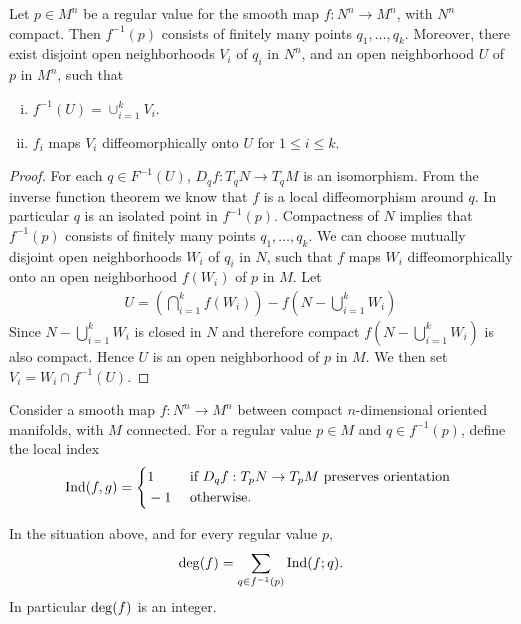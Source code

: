 \begin{lemma}\label{lemma:11-8}
  Let $p\in M^n$ be a regular value for the smooth map $f:N^n\to M^n$, with $N^n$ compact. 
  Then $f^{-1}(p)$ consists of finitely many points $q_1, \ldots, q_k$. Moreover, there exist 
  disjoint open neighborhoods $V_i$ of $q_i$ in $N^n$, and an open neighborhood $U$ of $p$ in $M^n$,
  such that
  \begin{enumerate}[(i)]
    \item $f^{-1}(U) = \cup_{i=1}^k V_i$.
    \item $f_i$ maps $V_i$ diffeomorphically onto $U$ for $1\le i\le k$.
  \end{enumerate}
\end{lemma}

\begin{proof}
  For each $q\in F^{-1}(U)$, $D_qf:T_qN\to T_q M$ is an isomorphism. From the
inverse function theorem we know that $f$ is a local diffeomorphism around $q$. In
particular $q$ is an isolated point in $f^{-1}(p)$. Compactness of $N$ implies that $f^{-1}(p)$
consists of finitely many points $q_1, \ldots, q_k$. We can choose mutually disjoint open
neighborhoods $W_i$ of $q_i$ in $N$, such that $f$ maps $W_i$ diffeomorphically onto an
open neighborhood $f(W_i)$ of $p$ in $M$. Let
\begin{align*}
  U = \left(\bigcap_{i=1}^k f(W_i)\right)
    - f\left(N - \bigcup_{i=1}^k W_i\right) 
\end{align*}
Since $N - \bigcup_{i=1}^k W_i$ is closed in $N$ and therefore compact $f(N - \bigcup_{i=1}^k W_i)$ is 
also compact. Hence $U$ is an open neighborhood of $p$ in $M$. We then set 
$V_i = W_i\cap f^{-1}(U)$.
\end{proof}

Consider a smooth map $f:N^n\to M^n$ between compact $n$-dimensional oriented
manifolds, with $M$ connected. For a regular value $p\in M$ and $q\in f^{-1}(p)$, define
the local index
\begin{align}
  \mathrm{Ind}(f, g) = \left\{\begin{aligned}
    & 1   && \text{ if } D_qf:T_pN \to T_pM \text{ preserves orientation } \\
    & -1  && \text{ otherwise. }
  \end{aligned}\right.
\end{align}

\begin{theorem}\label{theorem:11-9}
  In the situation above, and for every regular value $p$, 
  \begin{align*}
    \mathrm{deg}(f) = \sum_{q\in f^{-1}(p)}{\mathrm{Ind}(f; q)}.
  \end{align*}
  In particular $\mathrm{deg}(f)$ is an integer. 
\end{theorem}

